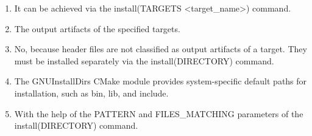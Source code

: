 

\begin{enumerate}
\item 
It can be achieved via the install(TARGETS <target\_name>) command.

\item
The output artifacts of the specified targets.

\item 
No, because header files are not classified as output artifacts of a target. They must be installed separately via the install(DIRECTORY) command.

\item 
The GNUInstallDirs CMake module provides system-specific default paths for installation, such as bin, lib, and include.

\item 
With the help of the PATTERN and FILES\_MATCHING parameters of the install(DIRECTORY) command.
\end{enumerate}